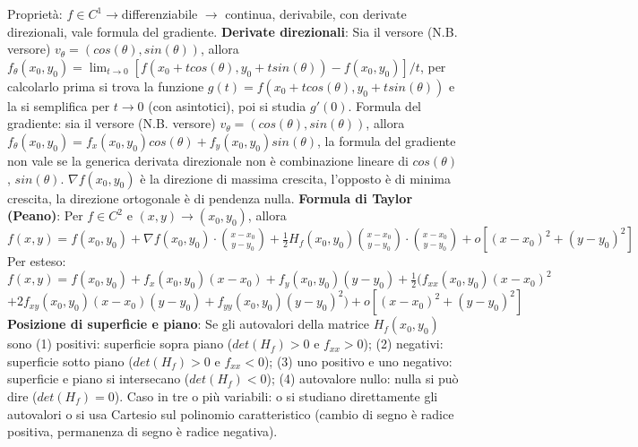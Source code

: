 \documentclass[fontsize=8pt]{scrartcl}
\begin{document}
\begin{multicols*}{4}
Proprietà: $f \in C^1 \rightarrow $differenziabile $\rightarrow $ continua, derivabile, con derivate direzionali, vale formula del gradiente.\newline
\textbf{Derivate direzionali}:\newline
Sia il versore (N.B. versore) $v_\theta = (cos(\theta), sin(\theta))$, allora $f_\theta (x_0, y_0) = \lim_{t\rightarrow 0} [ f(x_0 + t cos(\theta), y_0 + t sin(\theta)) - f(x_0,y_0)]/t$, per calcolarlo prima si trova la funzione $g(t) = f(x_0 + t cos(\theta), y_0 + t sin(\theta))$ e la si semplifica per $t \rightarrow 0$ (con asintotici), poi si studia $g'(0)$.\newline
Formula del gradiente: sia il versore (N.B. versore) $v_\theta = (cos(\theta), sin(\theta))$, allora $f_\theta(x_0,y_0) = f_x (x_0,y_0) cos(\theta) + f_y(x_0, y_0) sin(\theta)$, la formula del gradiente non vale se la generica derivata direzionale non è combinazione lineare di $cos(\theta)$, $sin(\theta)$.\newline
$\nabla f(x_0,y_0)$ è la direzione di massima crescita, l'opposto è di minima crescita, la direzione ortogonale è di pendenza nulla.\newline
\textbf{Formula di Taylor (Peano)}:\newline
Per $f \in C^2$ e $(x,y) \rightarrow  (x_0, y_0)$, allora $f(x,y) = f(x_0,y_0) + \nabla f(x_0,y_0) \cdot \binom{x-x_0}{y-y_0} + \frac{1}{2} H_f(x_0,y_0) \binom{x-x_0}{y-y_0} \cdot \binom{x-x_0}{y-y_0} + o[(x-x_0)^2 + (y-y_0)^2]$\newline
Per esteso: $f(x,y) = f(x_0, y_0) + f_x(x_0,y_0) (x-x_0) + f_y(x_0,y_0) (y-y_0) + \frac{1}{2} ( f_{xx}(x_0,y_0) (x-x_0)^2$ \newline $ + 2f_{xy}(x_0,y_0) (x-x_0) (y-y_0) + f_{yy}(x_0,y_0) (y-y_0)^2) +  o[(x-x_0)^2 + (y-y_0)^2]$\newline
\textbf{Posizione di superficie e piano}:\newline
Se gli autovalori della matrice $H_f(x_0,y_0)$ sono (1) positivi: superficie sopra piano ($det(H_f) > 0$ e $f_{xx}>0$); (2) negativi: superficie sotto piano ($det(H_f) > 0$ e $f_{xx}<0$); (3) uno positivo e uno negativo: superficie e piano si intersecano ($det(H_f) <0$); (4) autovalore nullo: nulla si può dire ($det(H_f) = 0$).\newline
Caso in tre o più variabili: o si studiano direttamente gli autovalori o si usa Cartesio sul polinomio caratteristico (cambio di segno è radice positiva, permanenza di segno è radice negativa).\newline

\end{multicols*}
\end{document}
